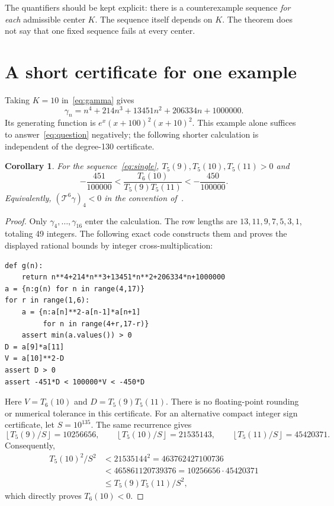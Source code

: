 \documentclass[11pt]{article}
\newtheorem{corollary}[theorem]{Corollary}
\begin{document}
The quantifiers should be kept explicit: there is a counterexample sequence
\emph{for each} admissible center $K$. The sequence itself depends on $K$.
The theorem does not say that one fixed sequence fails at every center.

\section{A short certificate for one example}
Taking $K=10$ in~\eqref{eq:gamma} gives
\begin{equation}\label{eq:single}
\boxed{\gamma_n=n^4+214n^3+13451n^2+206334n+1000000.}
\end{equation}
Its generating function is $e^x(x+100)^2(x+10)^2$. This example alone
suffices to answer~\eqref{eq:question} negatively; the following shorter
calculation is independent of the degree-130 certificate.
\begin{corollary}\label{cor:single}
For the sequence~\eqref{eq:single}, $T_5(9),T_5(10),T_5(11)>0$ and
\[
\boxed{-\frac{451}{100000}
<\frac{T_6(10)}{T_5(9)T_5(11)}
<-\frac{450}{100000}.}
\]
Equivalently, $(\mathcal T^6\gamma)_4<0$ in the convention of~\cite{B}.
\end{corollary}
\begin{proof}
Only $\gamma_4,\ldots,\gamma_{16}$ enter the calculation. The row lengths
are $13,11,9,7,5,3,1$, totaling 49 integers. The following exact code
constructs them and proves the displayed rational bounds by integer
cross-multiplication:
\par\noindent
\begin{minipage}{\linewidth}
\begin{lstlisting}
def g(n):
    return n**4+214*n**3+13451*n**2+206334*n+1000000
a = {n:g(n) for n in range(4,17)}
for r in range(1,6):
    a = {n:a[n]**2-a[n-1]*a[n+1]
         for n in range(4+r,17-r)}
    assert min(a.values()) > 0
D = a[9]*a[11]
V = a[10]**2-D
assert D > 0
assert -451*D < 100000*V < -450*D
\end{lstlisting}
\end{minipage}\par
Here $V=T_6(10)$ and $D=T_5(9)T_5(11)$. There is no floating-point
rounding or numerical tolerance in this certificate.
For an alternative compact integer sign certificate, let $S=10^{135}$.
The same recurrence gives
\[
\left\lfloor T_5(9)/S\right\rfloor=10256656,\qquad
\left\lfloor T_5(10)/S\right\rfloor=21535143,\qquad
\left\lfloor T_5(11)/S\right\rfloor=45420371.
\]
Consequently,
\begin{align*}
T_5(10)^2/S^2 &< 21535144^2=463762427100736\\
&<465861120739376=10256656\cdot45420371\\
&\le T_5(9)T_5(11)/S^2,
\end{align*}
which directly proves $T_6(10)<0$.

\end{proof}
\end{document}
